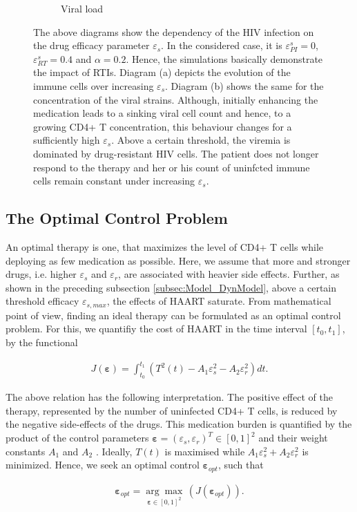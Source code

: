 \begin{figure}
\begin{subfigure}[b]{0.475\textwidth}
        \caption[]%
        {{\small Viral load}}    
        \label{fig3c:viral_load}
    \end{subfigure}
    \caption[]{The above diagrams show the dependency of the HIV infection on the drug efficacy parameter $\varepsilon_s$.
    In the considered case, it is $\varepsilon_{PI}^s =0$, $\varepsilon_{RT}^s = 0.4$ and $\alpha = 0.2$.
    Hence, the simulations basically demonstrate the impact of RTIs.
    Diagram (a) depicts the evolution of the immune cells over increasing $\varepsilon_s$. 
    Diagram (b) shows the same for the concentration of the viral strains.
    Although, initially enhancing the medication leads to a sinking viral cell count and hence, to a growing CD4+ T concentration, this behaviour changes for a sufficiently high $\varepsilon_s$.
    Above a certain threshold, the viremia is dominated by drug-resistant HIV cells. The patient does not longer respond to the therapy and her or his count of uninfcted immune cells remain constant under increasing $\varepsilon_s$.}
    \label{fig3:evolution_over_epsilon}
\end{figure}

\subsection{The Optimal Control Problem}
\label{subsec:Model_OptControl}

An optimal therapy is one, that maximizes the level of CD4+ T cells while deploying as few medication as possible.
Here, we assume that more and stronger drugs, i.e. higher $\varepsilon_s$ and $\varepsilon_r$, are associated with heavier 
side effects. 
Further, as shown in the preceding subsection \ref{subsec:Model_DynModel}, above a certain threshold efficacy $\varepsilon_{s,max}$, the effects of 
HAART saturate.\newline
From mathematical point of view, finding an ideal therapy can be formulated as an optimal control problem.
For this, we quantifiy the cost of HAART in the time interval $[t_0,t_1]$, by the functional

\begin{align}
    J(\mathbf{\varepsilon}) = \int_{t_0}^{t_1} \left(T^2(t) - A_1 \varepsilon_{s}^2 - A_2 \varepsilon_{r}^2\right) dt .
    \label{equ:cost_function}
\end{align}

The above relation has the following interpretation. 
The positive effect of the therapy, represented by the number of uninfected CD4+ T cells, is reduced by the negative side-effects of the drugs.
This medication burden is quantified by the product of the control parameters $\mathbf{\varepsilon} = (\varepsilon_s, \varepsilon_r)^T \in [0,1]^2$ and their weight constants $A_1$ and $A_2$ \cite{adams2005hiv,wu2010game}.
Ideally, $T(t)$ is maximised while $A_1 \varepsilon_{s}^2 + A_2 \varepsilon_{r}^2$ is minimized.
Hence, we seek an optimal control $\mathbf{\varepsilon}_{opt}$, such that

\begin{align}
    \mathbf{\varepsilon}_{opt} = \underset{\mathbf{\varepsilon} \in [0,1]^2}{\arg\max}\, (J(\mathbf{\varepsilon}_{opt})) \text{.}
    \label{equ:opti_control}
\end{align}
